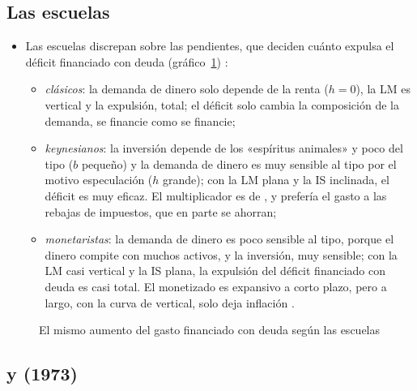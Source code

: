 \documentclass[11pt]{article}
\begin{document}
\subsection{Las escuelas}

\begin{itemize}
\item Las escuelas discrepan sobre las pendientes, que deciden cuánto expulsa el déficit financiado con deuda (gráfico~\ref{fig:islm-escuelas})  :
  \begin{itemize}
  \item \emph{clásicos}: la demanda de dinero solo depende de la renta ($h=0$), la LM es vertical y la expulsión, total; el déficit solo cambia la composición de la demanda, se financie como se financie;
  \item \emph{keynesianos}: la inversión depende de los «espíritus animales» y poco del tipo ($b$ pequeño) y la demanda de dinero es muy sensible al tipo por el motivo especulación ($h$ grande); con la LM plana y la IS inclinada, el déficit es muy eficaz. El multiplicador es de \textcite{Kahn1931Relation}, y  prefería el gasto a las rebajas de impuestos, que en parte se ahorran;
  \item \emph{monetaristas}: la demanda de dinero es poco sensible al tipo, porque el dinero compite con muchos activos, y la inversión, muy sensible; con la LM casi vertical y la IS plana, la expulsión del déficit financiado con deuda es casi total. El monetizado es expansivo a corto plazo, pero a largo, con la curva de  vertical, solo deja inflación .
  \end{itemize}
\end{itemize}

\begin{figure}[H]
\centering
\caption{El mismo aumento del gasto financiado con deuda según las escuelas}\label{fig:islm-escuelas}
\end{figure}

\subsection{ y  (1973)}
\end{document}
